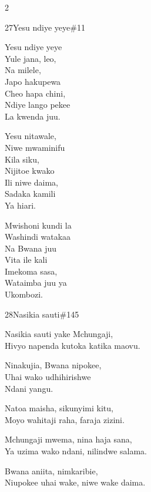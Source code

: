 \documentclass{article}
\begin{document}
\begin{multicols}{2}
\begin{hymn}{27}{Yesu ndiye yeye}{\#11}
\begin{stanza}
Yesu ndiye yeye\\
Yule jana, leo,\\
Na milele,\\
Japo hakupewa\\
Cheo hapa chini,\\
Ndiye lango pekee\\
La kwenda juu.
\end{stanza}
\begin{stanza}
Yesu nitawale,\\
Niwe mwaminifu\\
Kila siku,\\
Nijitoe kwako\\
Ili niwe daima,\\
Sadaka kamili\\
Ya hiari.
\end{stanza}
\begin{stanza}
Mwishoni kundi la\\
Washindi watakaa\\
Na Bwana juu\\
Vita ile kali\\
Imekoma sasa,\\
Wataimba juu ya\\
Ukombozi.
\end{stanza}
\end{hymn}

\begin{hymn}{28}{Nasikia sauti}{\#145}
\begin{stanza}
Nasikia sauti yake Mchungaji,\\
Hivyo napenda kutoka katika maovu.
\end{stanza}
\begin{chorus}
Ninakujia, Bwana nipokee,\\
Uhai wako udhihirishwe\\
Ndani yangu.
\end{chorus}
\begin{stanza}
Natoa maisha, sikunyimi kitu,\\
Moyo wahitaji raha, faraja zizini.
\end{stanza}
\begin{stanza}
Mchungaji mwema, nina haja sana,\\
Ya uzima wako ndani, nilindwe salama.
\end{stanza}
\begin{stanza}
Bwana aniita, nimkaribie,\\
Niupokee uhai wake, niwe wake daima.
\end{stanza}
\end{hymn}


\end{multicols}
\end{document}
